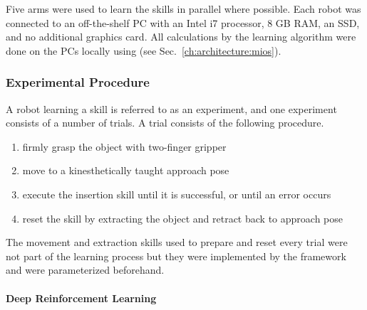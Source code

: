 Five \platformname{} arms \cite{Haddadin.2022} were used to learn the skills in parallel where possible.
Each robot was connected to an off-the-shelf PC with an Intel i7 processor, $8$ GB RAM, an SSD, and no additional graphics card.
All calculations by the learning algorithm were done on the PCs locally using \softwareabbr{} (see Sec.~\ref{ch:architecture:mios}).

\subsubsection{Experimental Procedure}

A robot learning a skill is referred to as an experiment, and one experiment consists of a number of trials.
A trial consists of the following procedure.
\begin{enumerate}
    \item firmly grasp the object with two-finger gripper
    \item move to a kinesthetically taught approach pose
    \item execute the insertion skill until it is successful, or until an error occurs
    \item reset the skill by extracting the object and retract back to approach pose
\end{enumerate}

The movement and extraction skills used to prepare and reset every trial were not part of the learning process but they were implemented by the \skillmodelabbr{} framework and were parameterized beforehand.

\paragraph{Deep Reinforcement Learning}

